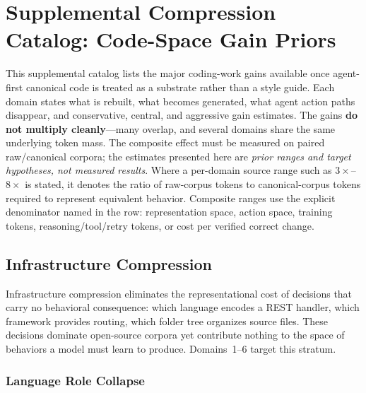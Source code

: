 
\section{Supplemental Compression Catalog: Code-Space Gain Priors}
\label{sec:compression-catalog}

This supplemental catalog lists the major coding-work gains available once agent-first canonical code
is treated as a substrate rather than a style guide.  Each domain states
what is rebuilt, what becomes generated, what agent action paths
disappear, and conservative, central, and aggressive gain estimates.  The
gains \textbf{do not multiply cleanly}---many overlap, and several
domains share the same underlying token mass.  The composite effect must
be measured on paired raw/canonical corpora; the estimates presented
here are \emph{prior ranges and target hypotheses, not measured results}.
Where a per-domain source range such as $3\times$--$8\times$ is stated,
it denotes the ratio of raw-corpus tokens to canonical-corpus tokens
required to represent equivalent behavior.  Composite ranges use the
explicit denominator named in the row: representation space, action
space, training tokens, reasoning/tool/retry tokens, or cost per verified
correct change.


\subsection{Infrastructure Compression}

Infrastructure compression eliminates the representational cost of
decisions that carry no behavioral consequence: which language encodes a
REST handler, which framework provides routing, which folder tree
organizes source files.  These decisions dominate open-source corpora yet
contribute nothing to the space of behaviors a model must learn to
produce.  Domains~1--6 target this stratum.

\subsubsection{Language Role Collapse}
\label{ssec:lang-collapse}


